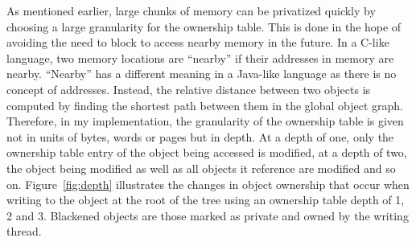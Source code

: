 As mentioned earlier, large chunks of memory can be privatized quickly
by choosing a large granularity for the ownership table.  This is done
in the hope of avoiding the need to block to access nearby memory in
the future.  In a C-like language, two memory locations are ``nearby''
if their addresses in memory are nearby.  ``Nearby'' has a different
meaning in a Java-like language as there is no concept of addresses.
Instead, the relative distance between two objects is computed by
finding the shortest path between them in the global object graph.
Therefore, in my implementation, the granularity of the ownership
table is given not in units of bytes, words or pages but in depth.  At
a depth of one, only the ownership table entry of the object being
accessed is modified, at a depth of two, the object being modified as
well as all objects it reference are modified and so on.
Figure~\ref{fig:depth} illustrates the changes in object ownership
that occur when writing to the object at the root of the tree using an
ownership table depth of 1, 2 and 3.  Blackened objects are those
marked as private and owned by the writing thread.

